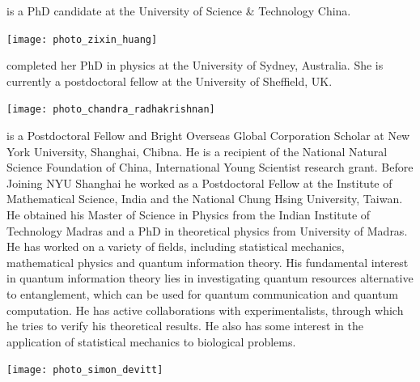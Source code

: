  is a PhD candidate at the University of Science \& Technology China.


%
%

\begin{center}
\texttt{[image: photo\_zixin\_huang]}
\end{center}

 completed her PhD in physics at the University of Sydney, Australia. She is currently a postdoctoral fellow at the University of Sheffield, UK.


%
%

\begin{center}
\texttt{[image: photo\_chandra\_radhakrishnan]}
\end{center}

 is a Postdoctoral Fellow and Bright Overseas Global Corporation Scholar at New York University, Shanghai, Chibna. He is a recipient of the National Natural Science Foundation of China, International Young Scientist research grant. Before Joining NYU Shanghai he worked as a Postdoctoral Fellow at the Institute of Mathematical Science, India and the National Chung Hsing University, Taiwan. He obtained his Master of Science in Physics from the Indian Institute of Technology Madras and a PhD in theoretical physics from University of Madras. He has worked on a variety of fields, including statistical mechanics, mathematical physics and quantum information theory. His fundamental interest in quantum information theory lies in investigating quantum resources alternative to entanglement, which can be used for quantum communication and quantum computation. He has active collaborations with experimentalists, through which he tries to verify his theoretical results. He also has some interest in the application of statistical mechanics to biological problems.

%
%

\begin{center}
\texttt{[image: photo\_simon\_devitt]}
\end{center}



%
%


